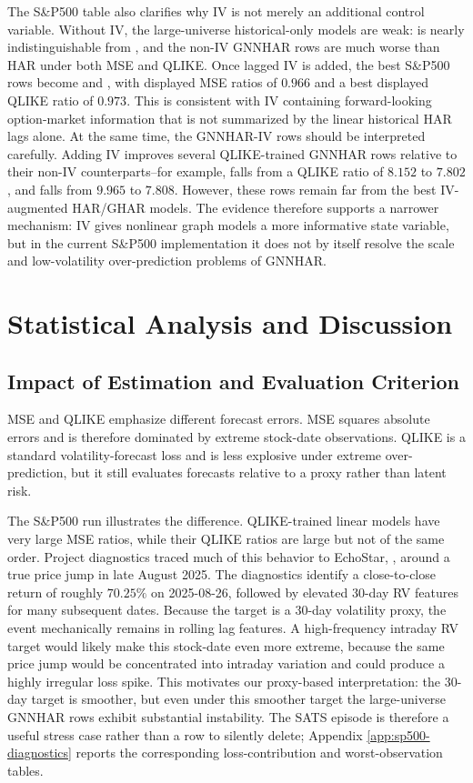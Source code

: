 \documentclass[11pt,a4paper]{article}
\newcommand{\model}[1]{\texttt{\detokenize{#1}}}
\begin{document}
The S\&P500 table also clarifies why IV is not merely an additional control variable.  Without IV, the large-universe historical-only models are weak: \model{GHAR_M} is nearly indistinguishable from \model{HAR_M}, and the non-IV GNNHAR rows are much worse than HAR under both MSE and QLIKE.  Once lagged IV is added, the best S\&P500 rows become \model{HAR_M_IV} and \model{GHAR_M_IV}, with displayed MSE ratios of \(0.966\) and a best displayed QLIKE ratio of \(0.973\).  This is consistent with IV containing forward-looking option-market information that is not summarized by the linear historical HAR lags alone.  At the same time, the GNNHAR-IV rows should be interpreted carefully.  Adding IV improves several QLIKE-trained GNNHAR rows relative to their non-IV counterparts--for example, \model{GNNHAR2L_Q} falls from a QLIKE ratio of \(8.152\) to \(7.802\), and \model{GNNHAR4L_Q} falls from \(9.965\) to \(7.808\).  However, these rows remain far from the best IV-augmented HAR/GHAR models.  The evidence therefore supports a narrower mechanism: IV gives nonlinear graph models a more informative state variable, but in the current S\&P500 implementation it does not by itself resolve the scale and low-volatility over-prediction problems of GNNHAR.

\section{Statistical Analysis and Discussion}
\label{sec:discussion}

\subsection{Impact of Estimation and Evaluation Criterion}
\label{subsec:criterion}

MSE and QLIKE emphasize different forecast errors.  MSE squares absolute errors and is therefore dominated by extreme stock-date observations.  QLIKE is a standard volatility-forecast loss and is less explosive under extreme over-prediction, but it still evaluates forecasts relative to a proxy rather than latent risk.

The S\&P500 run illustrates the difference.  QLIKE-trained linear models have very large MSE ratios, while their QLIKE ratios are large but not of the same order.  Project diagnostics traced much of this behavior to EchoStar, \model{SATS}, around a true price jump in late August 2025.  The diagnostics identify a close-to-close return of roughly \(70.25\%\) on 2025-08-26, followed by elevated 30-day RV features for many subsequent dates.  Because the target is a 30-day volatility proxy, the event mechanically remains in rolling lag features.  A high-frequency intraday RV target would likely make this stock-date even more extreme, because the same price jump would be concentrated into intraday variation and could produce a highly irregular loss spike.  This motivates our proxy-based interpretation: the 30-day target is smoother, but even under this smoother target the large-universe GNNHAR rows exhibit substantial instability.  The SATS episode is therefore a useful stress case rather than a row to silently delete; Appendix \ref{app:sp500-diagnostics} reports the corresponding loss-contribution and worst-observation tables.
\end{document}

